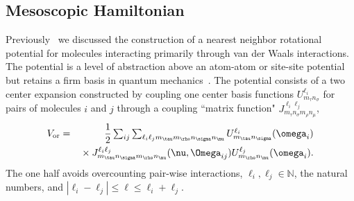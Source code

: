 \documentclass[preprint]{iucr}              %
\newcommand{\mb}[1]{\ensuremath{\mbox{\boldmath $ #1 $}}}
\begin{document}
\subsection{Mesoscopic Hamiltonian}
\label{hamiltonian}

Previously~\cite{Mettes04} we discussed the construction of a
nearest neighbor rotational potential for molecules interacting primarily
through van der Waals interactions.
The potential is a level of abstraction above an atom-atom or site-site
potential but retains a firm basis in quantum
mechanics~\cite{Avoird94}. The potential consists of a two center
expansion constructed by coupling one center basis functions
$U^{\ell_i}_{m_\tau n_\sigma}$ 
for pairs of molecules $i$ and $j$ through a coupling ``matrix function" 
$J_{m_\tau n_\sigma m_\rho n_\mu}^{\ell_i\ell_j}$,
\begin{eqnarray}
\label{re:eq:vij2}V_{\mathrm{or}} &=&
\frac{1}{2}\sum_{ij}\sum_{\ell_i\ell_j m_\tau m_\rho n_\sigma n_\mu}
U^{\ell_i}_{m_\tau n_\sigma}(\mb{\omega}_i)\nonumber\\
&&{}\times J_{m_\tau n_\sigma m_\rho n_\mu}^{\ell_i
\ell_j}(\mb{\nu},\mb{\Omega}_{ij})U^{\ell_j}_{m_\rho
n_\mu}(\mb{\omega}_i).
\end{eqnarray}
The one half avoids overcounting pair-wise interactions,
$\ell_i,\ell_j\in\mathbb{N}$, the
natural numbers, and $|\ell_i-\ell_j|\leq\ell\leq \ell_i+\ell_j$.
\end{document}
